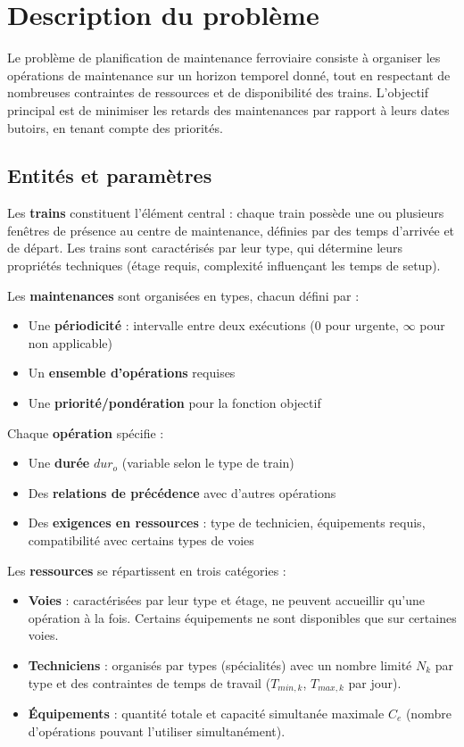 \section{Description du problème}
\label{sec:probleme}

Le problème de planification de maintenance ferroviaire consiste à organiser les opérations de maintenance sur un horizon temporel donné, tout en respectant de nombreuses contraintes de ressources et de disponibilité des trains. L'objectif principal est de minimiser les retards des maintenances par rapport à leurs dates butoirs, en tenant compte des priorités.

\subsection{Entités et paramètres}

Les \textbf{trains} constituent l'élément central : chaque train possède une ou plusieurs fenêtres de présence au centre de maintenance, définies par des temps d'arrivée et de départ. Les trains sont caractérisés par leur type, qui détermine leurs propriétés techniques (étage requis, complexité influençant les temps de setup).

Les \textbf{maintenances} sont organisées en types, chacun défini par :
\begin{itemize}
	\item Une \textbf{périodicité} : intervalle entre deux exécutions (0 pour urgente, $\infty$ pour non applicable)
	\item Un \textbf{ensemble d'opérations} requises
	\item Une \textbf{priorité/pondération} pour la fonction objectif
\end{itemize}

Chaque \textbf{opération} spécifie :
\begin{itemize}
	\item Une \textbf{durée} $dur_o$ (variable selon le type de train)
	\item Des \textbf{relations de précédence} avec d'autres opérations
	\item Des \textbf{exigences en ressources} : type de technicien, équipements requis, compatibilité avec certains types de voies
\end{itemize}

Les \textbf{ressources} se répartissent en trois catégories :
\begin{itemize}
	\item \textbf{Voies} : caractérisées par leur type et étage, ne peuvent accueillir qu'une opération à la fois. Certains équipements ne sont disponibles que sur certaines voies.
	\item \textbf{Techniciens} : organisés par types (spécialités) avec un nombre limité $N_k$ par type et des contraintes de temps de travail ($T_{min,k}$, $T_{max,k}$ par jour).
	\item \textbf{Équipements} : quantité totale et capacité simultanée maximale $C_e$ (nombre d'opérations pouvant l'utiliser simultanément).
\end{itemize}

